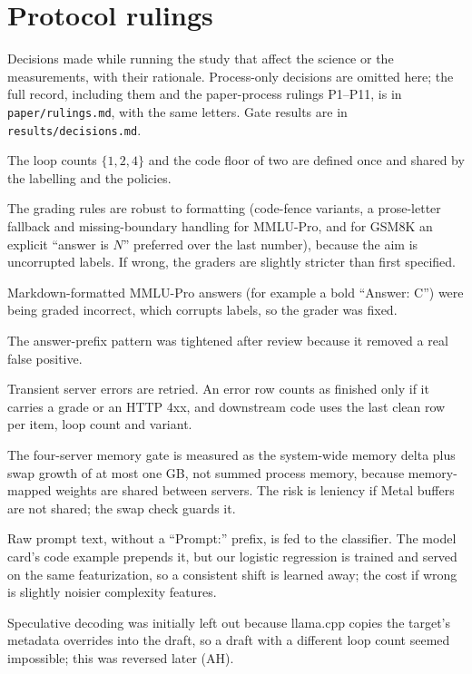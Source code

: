 \documentclass[11pt]{article}
\begin{document}
\section{Protocol rulings}
\label{app:rulings}
Decisions made while running the study that affect the science or the measurements, with their rationale. Process-only decisions are omitted here; the full record, including them and the paper-process rulings P1--P11, is in \texttt{paper/rulings.md}, with the same letters. Gate results are in \texttt{results/decisions.md}.
\begin{description}\small\setlength{\itemsep}{2pt}
\item[B] The loop counts $\{1,2,4\}$ and the code floor of two are defined once and shared by the labelling and the policies.
\item[J] The grading rules are robust to formatting (code-fence variants, a prose-letter fallback and missing-boundary handling for MMLU-Pro, and for GSM8K an explicit ``answer is $N$'' preferred over the last number), because the aim is uncorrupted labels. If wrong, the graders are slightly stricter than first specified.
\item[L] Markdown-formatted MMLU-Pro answers (for example a bold ``Answer: C'') were being graded incorrect, which corrupts labels, so the grader was fixed.
\item[M] The answer-prefix pattern was tightened after review because it removed a real false positive.
\item[P] Transient server errors are retried. An error row counts as finished only if it carries a grade or an HTTP 4xx, and downstream code uses the last clean row per item, loop count and variant.
\item[Q] The four-server memory gate is measured as the system-wide memory delta plus swap growth of at most one GB, not summed process memory, because memory-mapped weights are shared between servers. The risk is leniency if Metal buffers are not shared; the swap check guards it.
\item[R] Raw prompt text, without a ``Prompt:'' prefix, is fed to the classifier. The model card's code example prepends it, but our logistic regression is trained and served on the same featurization, so a consistent shift is learned away; the cost if wrong is slightly noisier complexity features.
\item[S] Speculative decoding was initially left out because llama.cpp copies the target's metadata overrides into the draft, so a draft with a different loop count seemed impossible; this was reversed later (AH).

\end{description}
\end{document}
